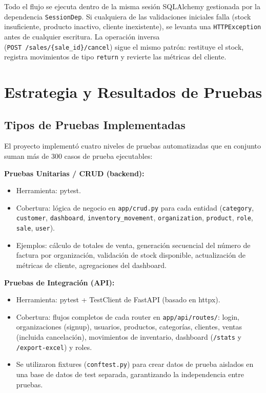 Todo el flujo se ejecuta dentro de la misma sesión SQLAlchemy gestionada por la dependencia \texttt{SessionDep}. Si cualquiera de las validaciones iniciales falla (stock insuficiente, producto inactivo, cliente inexistente), se levanta una \texttt{HTTPException} antes de cualquier escritura. La operación inversa (\texttt{POST\ /sales/\{sale\_id\}/cancel}) sigue el mismo patrón: restituye el stock, registra movimientos de tipo \texttt{return} y revierte las métricas del cliente.

\section{Estrategia y Resultados de Pruebas}\label{estrategia-y-resultados-de-pruebas}

\subsection{Tipos de Pruebas Implementadas}\label{tipos-de-pruebas-implementadas}

El proyecto implementó cuatro niveles de pruebas automatizadas que en conjunto suman más de 300 casos de prueba ejecutables:

\textbf{Pruebas Unitarias / CRUD (backend):}

\begin{itemize}
\tightlist
\item
  Herramienta: pytest.
\item
  Cobertura: lógica de negocio en \texttt{app/crud.py} para cada entidad (\texttt{category}, \texttt{customer}, \texttt{dashboard}, \texttt{inventory\_movement}, \texttt{organization}, \texttt{product}, \texttt{role}, \texttt{sale}, \texttt{user}).
\item
  Ejemplos: cálculo de totales de venta, generación secuencial del número de factura por organización, validación de stock disponible, actualización de métricas de cliente, agregaciones del dashboard.
\end{itemize}

\textbf{Pruebas de Integración (API):}

\begin{itemize}
\tightlist
\item
  Herramienta: pytest + TestClient de FastAPI (basado en httpx).
\item
  Cobertura: flujos completos de cada router en \texttt{app/api/routes/}: login, organizaciones (signup), usuarios, productos, categorías, clientes, ventas (incluida cancelación), movimientos de inventario, dashboard (\texttt{/stats} y \texttt{/export-excel}) y roles.
\item
  Se utilizaron fixtures (\texttt{conftest.py}) para crear datos de prueba aislados en una base de datos de test separada, garantizando la independencia entre pruebas.
\end{itemize}

